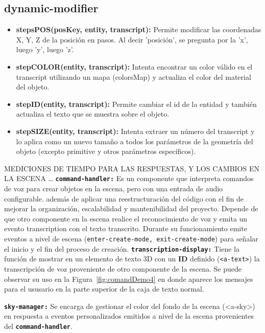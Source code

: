 \documentclass[a4paper, 12pt]{book}
\begin{document}
\subsection{dynamic-modifier}
\begin{itemize}
  \item \textbf{stepsPOS(posKey, entity, transcript):} Permite modificar las coordenadas X, Y, Z de la posición en pasos. Al decir 'posición', se pregunta por la 'x', luego 'y', luego 'z'.
  \item \textbf{stepCOLOR(entity, transcript):} Intenta encontrar un color válido en el transcript utilizando un mapa (colorsMap) y actualiza el color del material del objeto.
  \item \textbf{stepID(entity, transcript):} Permite cambiar el id de la entidad y también actualiza el texto que se muestra sobre el objeto.
  \item \textbf{stepSIZE(entity, transcript):} Intenta extraer un número del transcript y lo aplica como un nuevo tamaño a todos los parámetros de la geometría del objeto (excepto primitive y otros parámetros específicos).
\end{itemize}

MEDICIONES DE TIEMPO PARA LAS RESPUESTAS, Y LOS CAMBIOS EN LA ESCENA \dots
\texttt{\textbf{command-handler:}} Es un componente que interpreta comandos de voz para crear objetos en la escena, pero con una entrada de audio configurable.
además de aplicar una reestructuración del código con el fin de mejorar la organización, escalabilidad y mantenibilidad del proyecto.
Depende de que otro componente en la escena realice el reconocimiento de voz y emita un evento transcription con el texto transcrito.
Durante su funcionamiento emite eventos a nivel de escena (\texttt{enter-create-mode, exit-create-mode}) para señalar el inicio y el fin del proceso de creación.
\texttt{\textbf{transcription-display:}} Tiene la función de mostrar en un elemento de texto 3D con un \textbf{ID} definido (\texttt{<a-text>}) la transcripción de voz proveniente de otro componente de la escena.
Se puede observar su uso en la Figura~\ref{fig:comandDemo4} en donde aparece los mensajes para el ususario en la parte superior de la caja de texto normal.

\texttt{\textbf{sky-manager:}} Se encarga de gestionar el color del fondo de la escena (<a-sky>) en respuesta a eventos personalizados emitidos a nivel de la escena provenientes del \texttt{\textbf{command-handler}}.
\end{document}
